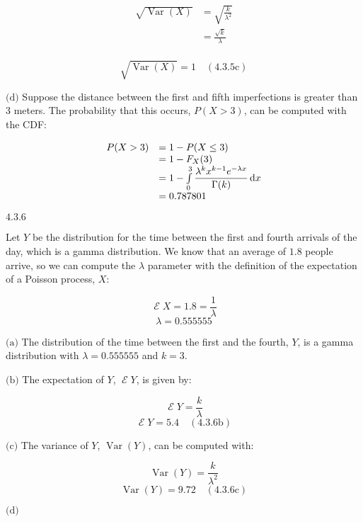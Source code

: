 \documentclass{article}
\newcommand{\problem}[2]{$\boxed{\text{#1.#2}}$}
\newcommand{\subproblem}[3]{$\boxed{\text{(#3)}}$}
\newcommand{\subsolution}[4]{\boxed{#4\quad(\text{#1.#2#3})}}
\renewcommand{\d}[1]{\,\textnormal{d}#1}
\newcommand{\multistep}[1]{\begin{array}{rl} #1 \end{array}}
\DeclareMathOperator{\var}{Var}
\DeclareMathOperator{\E}{\mathcal{E}}
\begin{document}
\[
\multistep{
\sqrt{\var(X)}&=\sqrt{\frac{k}{\lambda^2}} \\
&=\frac{\sqrt{k}}{\lambda} \\
}
\]

\[
\subsolution{4.3}{5}{c}{\sqrt{\var(X)}=1}
\]

%
\subproblem{4.3}{5}{d} Suppose the distance between the first and
fifth imperfections is greater than 3 meters. The probability that
this occurs, $P(X>3)$, can be computed with the CDF:

\[
\multistep{
P(X>3)&=1-P(X\le3) \\
&=1-F_X(3) \\
&=1-\int\limits_{0}^3 \dfrac{\lambda^k x^{k-1} e^{-\lambda x}}{\Gamma(k)} \d{x} \\
&=0.787801 \\
}
\]

%
\problem{4.3}{6}

Let $Y$ be the distribution for the time between the first and fourth
arrivals of the day, which is a gamma distribution. We know that an
average of $1.8$ people arrive, so we can compute the $\lambda$
parameter with the definition of the expectation of a Poisson process, $X$:

\[
\E X=1.8=\frac{1}{\lambda}
\] \[
\lambda=0.555555
\]

%
\subproblem{4.3}{6}{a} The distribution of the time between the first
and the fourth, $Y$, is a gamma distribution with $\lambda=0.555555$
and $k=3$.

%
\subproblem{4.3}{6}{b} The expectation of $Y$, $\E{}Y$, is given by:

\[
\E Y=\frac{k}{\lambda}
\] \[
\subsolution{4.3}{6}{b}{\E Y=5.4}
\]

%
\subproblem{4.3}{6}{c} The variance of $Y$, $\var(Y)$, can be computed
with:

\[
\var(Y)=\frac{k}{\lambda^2}
\] \[
\subsolution{4.3}{6}{c}{\var(Y)=9.72}
\]

%
\subproblem{4.3}{6}{d}
\end{document}
